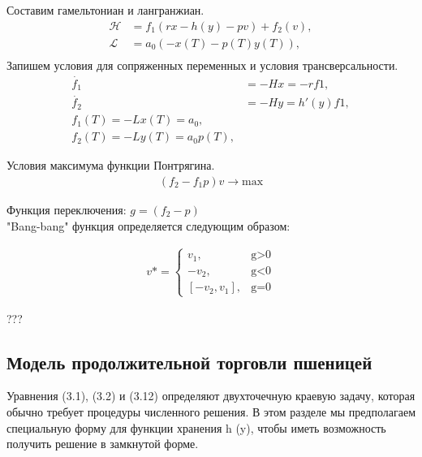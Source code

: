 Составим гамельтониан и лангранжиан. 
\begin{align}
    \mathcal{H} & = f_{1} (r x - h(y) - p v) + f_{2} (v),\\
    \mathcal{L} & = a_{0} (-x(T) - p(T) y(T)),\\
\end{align} 
Запишем условия для сопряженных переменных и условия трансверсальности.
\begin{align}
    \Dot{f_{1}} & = -H x = -r f1,\\
    \Dot{f_{2}} & = -H y = h'(y) f1,\\
    {f_{1}(T)} = - {L}x(T)=a_{0},\\
    {f_{2}(T)} = - {L}y(T)=a_{0} p(T),
\end{align} 

Условия максимума функции Понтрягина.
\begin{align}
    (f_{2} - f_{1} p)v\to \mathrm{max}
\end{align} 

Функция переключения:
$g = (f_{2} - p)$\\

"Bang-bang" функция определяется следующим образом:

\begin{align}
v* = 
 \begin{cases}
   v_{1}, &\text{g>0}\\
   -v_{2}, &\text{g<0}\\
   [-v_{2},v_{1}], &\text{g=0}
 \end{cases}
\end{align}


???

\subsection{Модель продолжительной торговли пшеницей}
Уравнения (3.1), (3.2) и (3.12) определяют двухточечную краевую задачу, которая обычно требует процедуры численного решения. В этом разделе мы предполагаем специальную форму для функции хранения h (y), чтобы иметь возможность получить решение в замкнутой форме.

